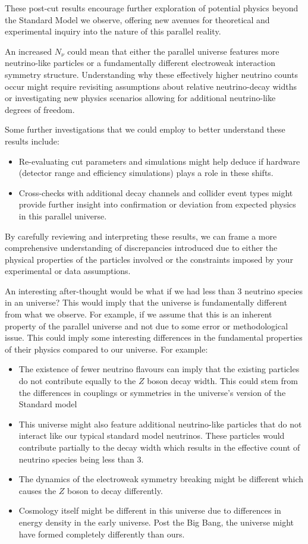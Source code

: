 These post-cut results encourage further exploration of potential physics beyond the Standard Model we observe, offering new avenues for theoretical and experimental inquiry into the nature of this parallel reality.

An increased \(N_\nu\) could mean that either the parallel universe features more neutrino-like particles or a fundamentally different electroweak interaction symmetry structure. Understanding why these effectively higher neutrino counts occur might require revisiting assumptions about relative neutrino-decay widths or investigating new physics scenarios allowing for additional neutrino-like degrees of freedom.

Some further investigations that we could employ to better understand these results include:
\begin{itemize}[label=\(\ \star \)]
\item Re-evaluating cut parameters and simulations might help deduce if hardware (detector range and efficiency simulations) plays a role in these shifts.
\item Cross-checks with additional decay channels and collider event types might provide further insight into confirmation or deviation from expected physics in this parallel universe.
\end{itemize}
By carefully reviewing and interpreting these results, we can frame a more comprehensive understanding of discrepancies introduced due to either the physical properties of the particles involved or the constraints imposed by your experimental or data assumptions.

An interesting after-thought would be what if we had less than 3 neutrino species in an universe? This would imply that the universe is fundamentally different from what we observe. For example, if we assume that this is an inherent property of the parallel universe and not due to some error or methodological issue. This could imply some interesting differences in the fundamental properties of their physics compared to our universe. For example:
\begin{itemize}[label=\(\ \star \)]
    \item The existence of fewer neutrino flavours can imply that the existing particles do not contribute equally to the $Z$ boson decay width. This could stem from the differences in couplings or symmetries in the universe's version of the Standard model
    \item This universe might also feature additional neutrino-like particles that do not interact like our typical standard model neutrinos. These particles would contribute partially to the decay width which results in the effective count of neutrino species being less than 3.
    \item The dynamics of the electroweak symmetry breaking might be different which causes the $Z$ boson to decay differently. 
    \item Cosmology itself might be different in this universe due to differences in energy density in the early universe. Post the Big Bang, the universe might have formed completely differently than ours.
\end{itemize}